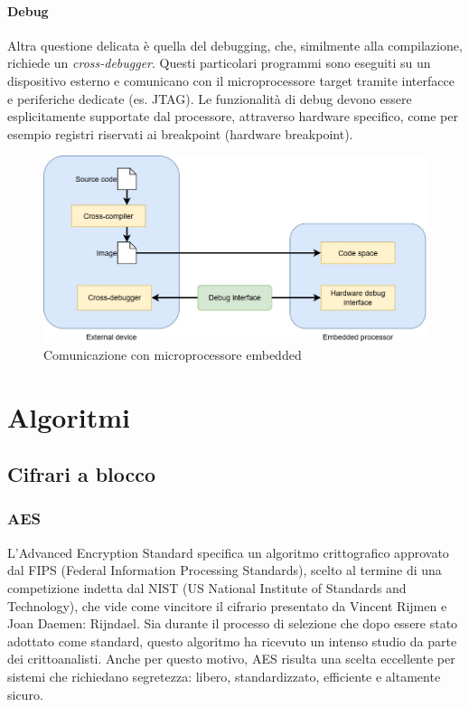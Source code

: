 \documentclass[target=bach,aauheader=,style=]{thud}
\begin{document}
			\subsubsection{Debug}
			Altra questione delicata è quella del debugging, che, similmente alla compilazione, richiede un \textit{cross-debugger}. Questi particolari programmi sono eseguiti su un dispositivo esterno e comunicano con il microprocessore target tramite interfacce e periferiche dedicate (es. JTAG).
			Le funzionalità di debug devono essere esplicitamente supportate dal processore, attraverso hardware specifico, come per esempio registri riservati ai breakpoint (hardware breakpoint).
			
			\begin{figure}[h]
				\centering
				\includegraphics[width=0.5\linewidth]{img/cross-compiler-debugger.jpg}
				\caption{Comunicazione con microprocessore embedded}
				\label{fig:placeholder}
			\end{figure}
			    		
\chapter{Algoritmi}
	\section{Cifrari a blocco}
		\subsection{AES}\cite{aes}
		L'Advanced Encryption Standard specifica un algoritmo crittografico approvato dal FIPS (Federal Information Processing Standards), scelto al termine di una competizione indetta dal NIST (US National Institute of Standards and Technology), che vide come vincitore il cifrario presentato da Vincent Rijmen e Joan Daemen: Rijndael. Sia durante il processo di selezione che dopo essere stato adottato come standard, questo algoritmo ha ricevuto un intenso studio da parte dei crittoanalisti. Anche per questo motivo, AES risulta una scelta eccellente per sistemi che richiedano segretezza: libero, standardizzato, efficiente e altamente sicuro. \cite{moderncrypto}
\end{document}
